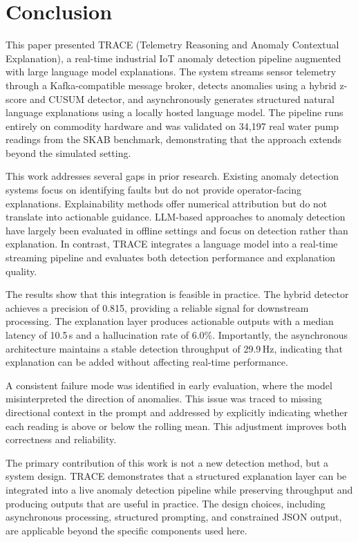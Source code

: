 \documentclass[11pt, a4paper]{article}
\begin{document}
\section{Conclusion}

This paper presented TRACE (Telemetry Reasoning and Anomaly Contextual 
Explanation), a real-time industrial IoT anomaly detection pipeline 
augmented with large language model explanations. The system streams 
sensor telemetry through a Kafka-compatible message broker, detects 
anomalies using a hybrid z-score and CUSUM detector, and asynchronously 
generates structured natural language explanations using a locally 
hosted language model. The pipeline runs entirely on commodity hardware 
and was validated on 34,197 real water pump readings from the SKAB 
benchmark, demonstrating that the approach extends beyond the simulated 
setting.

This work addresses several gaps in prior research. Existing anomaly 
detection systems focus on identifying faults but do not provide 
operator-facing explanations. Explainability methods offer numerical 
attribution but do not translate into actionable guidance. LLM-based 
approaches to anomaly detection have largely been evaluated in offline 
settings and focus on detection rather than explanation. In contrast, 
TRACE integrates a language model into a real-time streaming pipeline 
and evaluates both detection performance and explanation quality.

The results show that this integration is feasible in practice. The 
hybrid detector achieves a precision of 0.815, providing a reliable 
signal for downstream processing. The explanation layer produces 
actionable outputs with a median latency of 10.5\,s and a hallucination 
rate of 6.0\%. Importantly, the asynchronous architecture maintains a 
stable detection throughput of 29.9\,Hz, indicating that explanation can 
be added without affecting real-time performance.

A consistent failure mode was identified in early evaluation, where the 
model misinterpreted the direction of anomalies. This issue was traced 
to missing directional context in the prompt and addressed by explicitly 
indicating whether each reading is above or below the rolling mean. This 
adjustment improves both correctness and reliability.

The primary contribution of this work is not a new detection method, but 
a system design. TRACE demonstrates that a structured explanation layer 
can be integrated into a live anomaly detection pipeline while preserving 
throughput and producing outputs that are useful in practice. The design 
choices, including asynchronous processing, structured prompting, and 
constrained JSON output, are applicable beyond the specific components 
used here.
\end{document}
